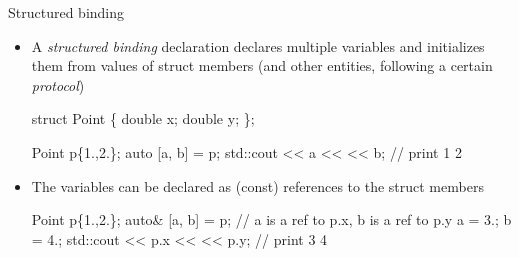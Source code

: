 \begin{frame}[fragile]{Structured binding}
  \begin{itemize}
  \item A \textit{structured binding} declaration declares multiple variables
    and initializes them from values of struct members (and other entities,
    following a certain \textit{protocol})
    \begin{codeblock}
struct Point \{
  double x;
  double y;
\};

Point p\{1.,2.\};
auto [a, b] = p;
std::cout << a << \upquote{ } << b; // print 1 2\end{codeblock}

  \item<2-> The variables can be declared as (const) references to the struct members
    \begin{codeblock}
Point p\{1.,2.\};
auto& [a, b] = p; // a is a ref to p.x, b is a ref to p.y
a = 3.;
b = 4.;
std::cout << p.x << \upquote{ } << p.y; // print 3 4\end{codeblock}

  \end{itemize}
\end{frame}

